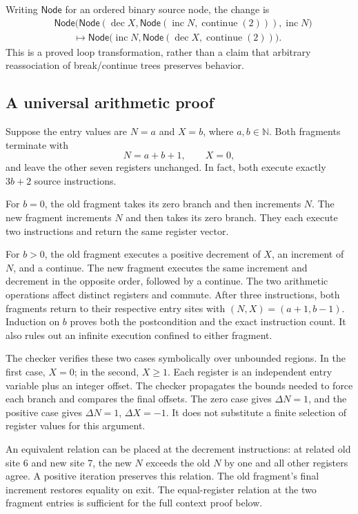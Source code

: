Writing $\mathsf{Node}$ for an ordered binary source node, the change is
\[
\begin{split}
&\mathsf{Node}\bigl(
 \mathsf{Node}(\operatorname{dec}X,
   \mathsf{Node}(\operatorname{inc}N,\operatorname{continue}(2))),
 \operatorname{inc}N\bigr)\\
&\hspace{2em}\longmapsto
 \mathsf{Node}\bigl(\operatorname{inc}N,
   \mathsf{Node}(\operatorname{dec}X,\operatorname{continue}(2))\bigr).
\end{split}
\]
This is a proved loop transformation, rather than a claim that arbitrary
reassociation of break/continue trees preserves behavior.

\subsection{A universal arithmetic proof}

Suppose the entry values are $N=a$ and $X=b$, where $a,b\in\mathbb N$.
Both fragments terminate with
\[
 N=a+b+1,\qquad X=0,
\]
and leave the other seven registers unchanged.  In fact, both execute
exactly $3b+2$ source instructions.

For $b=0$, the old fragment takes its zero branch and then increments
$N$.  The new fragment increments $N$ and then takes its zero branch.
They each execute two instructions and return the same register vector.

For $b>0$, the old fragment executes a positive decrement of $X$, an
increment of $N$, and a continue.  The new fragment executes the same
increment and decrement in the opposite order, followed by a continue.
The two arithmetic operations affect distinct registers and commute.
After three instructions, both fragments return to their respective
entry sites with $(N,X)=(a+1,b-1)$.  Induction on $b$ proves both the
postcondition and the exact instruction count.  It also rules out an
infinite execution confined to either fragment.

The checker verifies these two cases symbolically over unbounded regions.
In the first case, $X=0$; in the second, $X\geq1$.  Each register is an
independent entry variable plus an integer offset.  The checker propagates
the bounds needed to force each branch and compares the final offsets.
The zero case gives $\Delta N=1$, and the positive case gives
$\Delta N=1$, $\Delta X=-1$.  It does not substitute a finite selection of
register values for this argument.

An equivalent relation can be placed at the decrement instructions:
at related old site 6 and new site 7, the new $N$ exceeds the old $N$ by
one and all other registers agree.  A positive iteration preserves this
relation.  The old fragment's final increment restores equality on exit.
The equal-register relation at the two fragment entries is sufficient for
the full context proof below.

